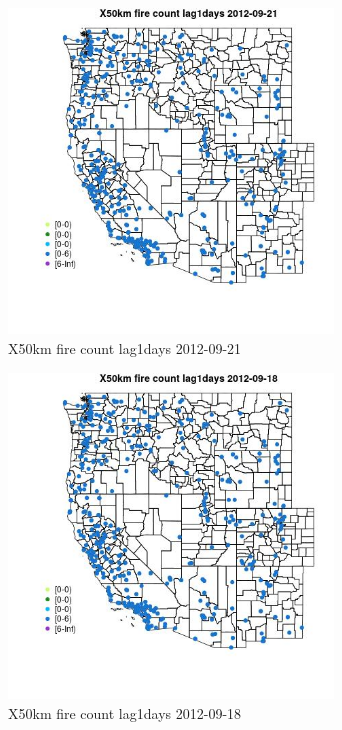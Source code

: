 \begin{figure} 
\centering  
\includegraphics[width=0.77\textwidth]{Code_Outputs/Report_ML_input_PM25_Step4_part_e_de_duplicated_aves_compiled_2019-05-14wNAs_MapObsX50km_fire_count_lag1days2012-09-21.jpg} 
\caption{\label{fig:Report_ML_input_PM25_Step4_part_e_de_duplicated_aves_compiled_2019-05-14wNAsMapObsX50km_fire_count_lag1days2012-09-21}X50km fire count lag1days 2012-09-21} 
\end{figure} 
 

\begin{figure} 
\centering  
\includegraphics[width=0.77\textwidth]{Code_Outputs/Report_ML_input_PM25_Step4_part_e_de_duplicated_aves_compiled_2019-05-14wNAs_MapObsX50km_fire_count_lag1days2012-09-18.jpg} 
\caption{\label{fig:Report_ML_input_PM25_Step4_part_e_de_duplicated_aves_compiled_2019-05-14wNAsMapObsX50km_fire_count_lag1days2012-09-18}X50km fire count lag1days 2012-09-18} 
\end{figure} 
 

